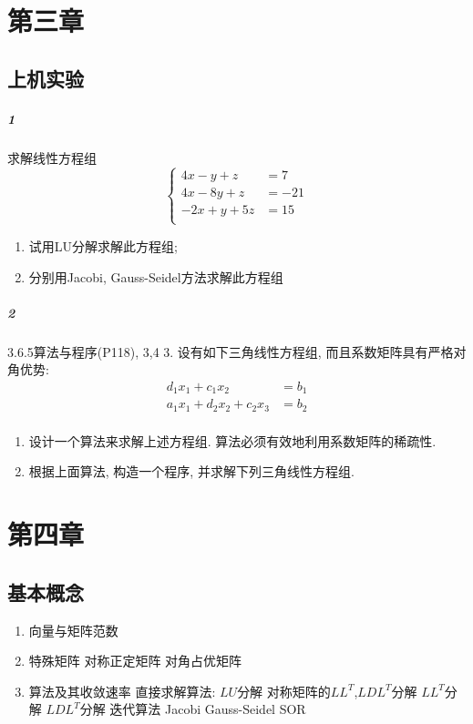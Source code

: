 \documentclass{ctexart}
\begin{document}
\section{第三章}
\subsection{上机实验}
	\subparagraph{1}
	求解线性方程组
	\begin{equation}
		\left\{
		\begin{aligned}
		4x-y+z &=7 \\
		4x-8y+z &= -21 \\
		-2x+y+5z&=15 \\
		\end{aligned}
		\right.
	\end{equation}
	\begin{enumerate}
		\item 试用LU分解求解此方程组;
		\item 分别用Jacobi, Gauss-Seidel方法求解此方程组
	\end{enumerate}
	\subparagraph{2}
	3.6.5算法与程序(P118), 3,4
	3. 设有如下三角线性方程组, 而且系数矩阵具有严格对角优势:
	$$
	\begin{aligned}
		d_1 x_1 + c_1 x_2 &= b_1 \\
		a_1 x_1 + d_2 x_2 + c_2 x_3 &= b_2 \\
	\end{aligned}
	$$
	\begin{enumerate}
		\item 设计一个算法来求解上述方程组. 算法必须有效地利用系数矩阵的稀疏性.
		\item 根据上面算法, 构造一个程序, 并求解下列三角线性方程组.

	\end{enumerate}
\section{第四章}
\subsection{基本概念}
	\begin{enumerate}
		\item 向量与矩阵范数
		\item 特殊矩阵
			\subitem 对称正定矩阵
			\subitem 对角占优矩阵
		\item 算法及其收敛速率
			\subitem 直接求解算法: $LU$分解
			\subitem 对称矩阵的$LL^T$,$LDL^T$分解
				\subsubitem $LL^T$分解
				\subsubitem $LDL^T$分解
			\subitem 迭代算法
				\subsubitem Jacobi
				\subsubitem Gauss-Seidel
				\subsubitem SOR
	\end{enumerate}
\end{document}
